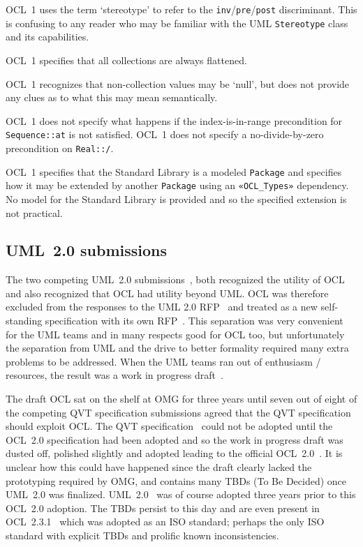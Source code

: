 \documentclass{jot}
\begin{document}

OCL~1 uses the term `stereotype' to refer to the \verb$inv$/\verb$pre$/\verb$post$ discriminant. This is confusing to any reader who may be familiar with the UML \verb$Stereotype$ class and its capabilities.

OCL~1 specifies that all collections are always flattened.

OCL~1 recognizes that non-collection values may be `null', but does not provide any clues as to what this may mean semantically.

OCL~1 does not specify what happens if the index-is-in-range precondition for \verb$Sequence::at$ is not satisfied. OCL~1 does not specify a no-divide-by-zero precondition on \verb$Real::/$.

OCL~1 specifies that the Standard Library is a modeled \verb$Package$ and specifies how it may be extended by another \verb$Package$ using an \verb$«OCL_Types»$ dependency. No model for the Standard Library is provided and so the specified extension is not practical. 

\subsection{UML~2.0 submissions}

The two competing UML~2.0 submissions~\cite{UML-2U},\cite{UML-U2P} both recognized the utility of OCL and also recognized that OCL had utility beyond UML. OCL was therefore excluded from the responses to the UML 2.0 RFP~\cite{UML-2.0-RFP} and treated as a new self-standing specification with its own RFP~\cite{OCL-2.0-RFP}. This separation was very convenient for the UML teams and in many respects good for OCL too, but unfortunately the separation from UML and the drive to better formality required many extra problems to be addressed. When the UML teams ran out of enthusiasm / resources, the result was a work in progress draft~\cite{OCL-2.0-draft}.

The draft OCL sat on the shelf at OMG for three years until seven out of eight of the competing QVT specification submissions agreed that the QVT specification should exploit OCL. The QVT specification~\cite{QVT-1.0} could not be adopted until the OCL~2.0 specification had been adopted and so the work in progress draft was dusted off, polished slightly and adopted leading to the official OCL~2.0~\cite{OCL-2.0}. It is unclear how this could have happened since the draft clearly lacked the prototyping required by OMG, and contains many TBDs (To Be Decided) once UML~2.0 was finalized. UML~2.0~\cite{UML-2.0-adopted} was of course adopted three years prior to this OCL~2.0 adoption. The TBDs persist to this day and are even present in OCL~2.3.1~\cite{OCL-2.3.1} which was adopted as an ISO standard; perhaps the only ISO standard with explicit TBDs and prolific known inconsistencies.
\end{document}

